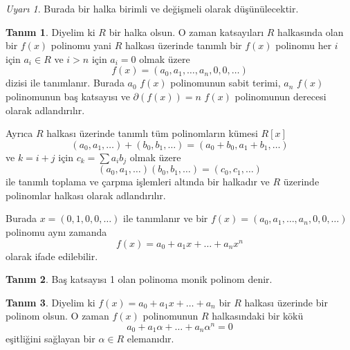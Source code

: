 \documentclass{article}
\theoremstyle{definition}
\newtheorem{defn}{Tanım}[section]
\theoremstyle{remark}
\newtheorem{rem}{Uyarı}[section]
\begin{document}
        	\begin{rem}
        	    Burada bir halka birimli ve değişmeli olarak düşünülecektir.
        	\end{rem}
        	
        	\begin{defn}
        	    Diyelim ki $R$ bir halka olsun. O zaman katsayıları $R$ halkasında olan bir $f(x)$ polinomu yani $R$ halkası üzerinde tanımlı bir $f(x)$ polinomu her $i$ için $a_i \in R$ ve $i > n$ için $a_i = 0$ olmak üzere
        	    \begin{equation*}
        	        f(x) = (a_0, a_1, \dots, a_n, 0, 0, \dots)
        	    \end{equation*}
        	    dizisi ile tanımlanır. Burada $a_0$ $f(x)$ polinomunun sabit terimi, $a_n$ $f(x)$ polinomunun baş katsayısı ve $\partial(f(x)) = n$ $f(x)$ polinomunun derecesi olarak adlandırılır.\par
        	    Ayrıca $R$ halkası üzerinde tanımlı tüm polinomların kümesi $R[x]$
        	    \begin{equation*}
        	        (a_0, a_1, \dots) + (b_0, b_1, \dots) = (a_0 + b_0, a_1 + b_1, \dots) 
        	    \end{equation*}
        	    ve $k = i + j$ için $c_k = \sum{a_ib_j}$ olmak üzere
        	    \begin{equation*}
        	        (a_0, a_1, \dots)(b_0, b_1, \dots) = (c_0, c_1, \dots)
        	    \end{equation*}
        	    ile tanımlı toplama ve çarpma işlemleri altında bir halkadır ve $R$ üzerinde polinomlar halkası olarak adlandırılır.\par
        	    Burada $x = (0, 1, 0, 0, \dots)$ ile tanımlanır ve bir $f(x) = (a_0, a_1, \dots, a_n, 0, 0, \dots)$ polinomu aynı zamanda
        	    \begin{equation*}
        	        f(x) = a_0 + a_1x + \dots + a_nx^n
        	    \end{equation*}
        	    olarak ifade edilebilir.
        	\end{defn}
        	
        	\begin{defn}
        	    Baş katsayısı 1 olan polinoma monik polinom denir.
        	\end{defn}
        		
        	\begin{defn}
        	    Diyelim ki $f(x) = a_0 + a_1x + \dots + a_n$ bir $R$ halkası üzerinde bir polinom olsun. O zaman $f(x)$ polinomunun $R$ halkasındaki bir kökü
        	    \begin{equation*}
    			    a_0 + a_1\alpha + \dots + a_n\alpha^n = 0
    			\end{equation*}
    			eşitliğini sağlayan bir $\alpha \in R$ elemanıdır.
    		\end{defn}
    		
\end{document}
